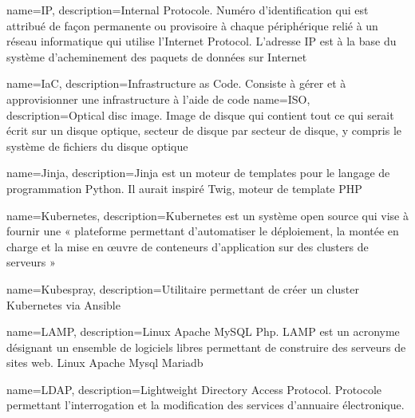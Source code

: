 {
    name=IP,
    description={Internal Protocole. Numéro d'identification qui est attribué de façon permanente ou provisoire à chaque périphérique relié à un réseau informatique qui utilise l'Internet Protocol. L'adresse IP est à la base du système d'acheminement des paquets de données sur Internet}
}

{
    name=IaC,
    description={Infrastructure as Code. Consiste à gérer et à approvisionner une infrastructure à l'aide de code}
}
{
    name=ISO,
    description={Optical disc image. Image de disque qui contient tout ce qui serait écrit sur un disque optique, secteur de disque par secteur de disque, y compris le système de fichiers du disque optique}
}


{
    name=Jinja,
    description={Jinja est un moteur de templates pour le langage de programmation Python. Il aurait inspiré Twig, moteur de template PHP}
}


{
    name=Kubernetes,
    description={Kubernetes est un système open source qui vise à fournir une « plateforme permettant d'automatiser le déploiement, la montée en charge et la mise en œuvre de conteneurs d'application sur des clusters de serveurs »}
}

{
    name=Kubespray,
    description={Utilitaire permettant de créer un cluster Kubernetes via Ansible}
}

{
    name=LAMP,
    description={Linux Apache MySQL Php. LAMP est un acronyme désignant un ensemble de logiciels libres permettant de construire des serveurs de sites web. Linux Apache Mysql Mariadb}
}

{
    name=LDAP,
    description={Lightweight Directory Access Protocol. Protocole permettant l'interrogation et la modification des services d'annuaire électronique.}
}

